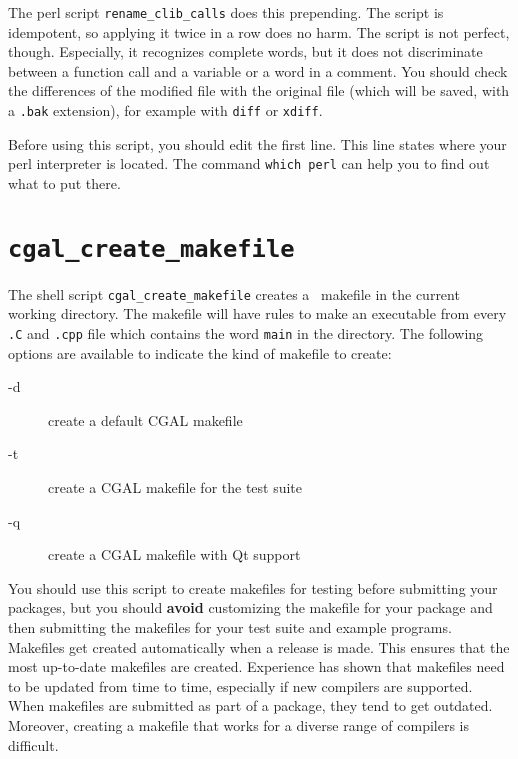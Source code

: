 The perl script
{{\tt rename\_clib\_calls}}
does this prepending.
The script is idempotent, so applying it twice in a row does no harm.
The script is not perfect, though. Especially, it recognizes complete
words, but it does not discriminate between a function call and a variable
or a word in a comment.
You should check the differences of the modified file with the original
file (which will be saved, with a {\tt .bak} extension), for example with
{\tt diff} or {\tt xdiff}.

Before using this script, you should edit the first line. This line
states where your perl interpreter is located. The command {\tt which perl}
can help you to find out what to put there.

\section{{\tt cgal\_create\_makefile}}
\label{sec:cgal_create_makefile}

The shell script
{{\tt cgal\_create\_makefile}} creates a \cgal\ makefile
in the current working directory.
The makefile will have rules to make an executable from every {\tt .C}
and {\tt .cpp} file which contains the word {\tt main} in the directory.
The following options are available to indicate the kind of makefile
to create:
\begin{description}
\item[-d]   create a default CGAL makefile
\item[-t]   create a CGAL makefile for the test suite
\item[-q]   create a CGAL makefile with Qt support
\end{description}

You should use this script to create makefiles for testing before submitting
your packages, but you should {\bf avoid} customizing the makefile for your
package and then submitting the makefiles for your test suite and example
programs.
Makefiles get created automatically when a release is made. This ensures
that the most up-to-date makefiles are created. Experience has shown
that makefiles need to be updated from time to time, especially if new
compilers are supported. When makefiles are submitted as part of a package,
they tend to get outdated.
Moreover, creating a makefile that works for a diverse range of compilers
is difficult.


